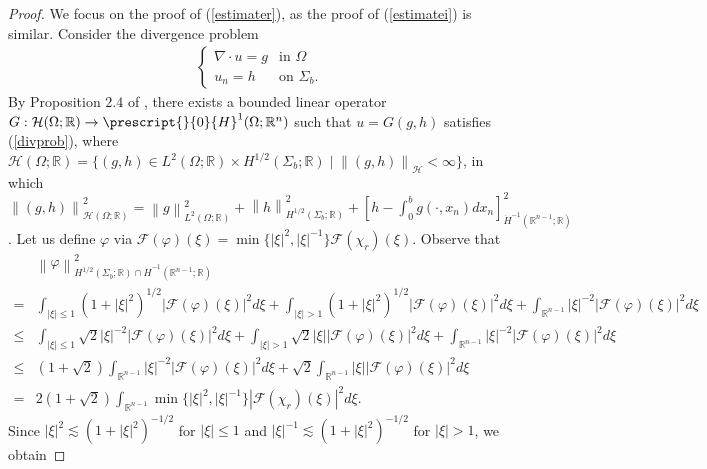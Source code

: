 \documentclass[11pt,letterpaper,reqno]{amsart}
\numberwithin{equation}{section}
\newcommand{\abs}[1]{\left\lvert#1\right\rvert}
\newcommand{\norm}[1]{\left\lVert#1\right\rVert}
\begin{document}
\begin{proof}
    We focus on the proof of (\ref{estimater}), as the proof of (\ref{estimatei}) is similar. Consider the divergence problem
    \begin{align} \label{divprob}
        \begin{cases}
            \nabla \cdot u = g &\mbox{in \(\Omega\)} \\
            u_{n}=h &\mbox{on \(\Sigma_{b}\)}.
        \end{cases}
    \end{align}
    By Proposition \(2.4\) of \cite{MR4337506}, there exists a bounded linear operator \(G:\mathcal{H}(\Omega;\mathbb{R}) \to \prescript{}{0}{H}^{1}(\Omega;\mathbb{R}^{n})\) such that \(u=G(g,h)\) satisfies (\ref{divprob}), where \(\mathcal{H}(\Omega;\mathbb{R})=\{(g,h)\in L^{2}(\Omega;\mathbb{R}) \times H^{1/2}(\Sigma_{b};\mathbb{R})\mid \norm{(g,h)}_{\mathcal{H}}<\infty\}\), in which \(\norm{(g,h)}_{\mathcal{H}(\Omega;\mathbb{R})}^{2}=\norm{g}_{L^{2}(\Omega;\mathbb{R})}^{2}+\norm{h}_{H^{1/2}(\Sigma_{b};\mathbb{R})}^{2}+[h-\int_{0}^{b}g(\cdot,x_{n})dx_{n}]_{\dot{H}^{-1}(\mathbb{R}^{n-1};\mathbb{R})}^{2}\). Let us define \(\varphi\) via \(\mathcal{F}(\varphi)(\xi)=\min\{\abs{\xi}^{2},\abs{\xi}^{-1}\}\mathcal{F}(\chi_{r})(\xi)\). Observe that
    \begin{align}
        &\norm{\varphi}_{H^{1/2}(\Sigma_{b};\mathbb{R})\cap \dot{H}^{-1}(\mathbb{R}^{n-1};\mathbb{R})}^{2} \nonumber \\
        =&\int_{\abs{\xi} \leq 1}(1+\abs{\xi}^{2})^{1/2}\abs{\mathcal{F}(\varphi)(\xi)}^{2}d\xi+\int_{\abs{\xi}>1}(1+\abs{\xi}^{2})^{1/2}\abs{\mathcal{F}(\varphi)(\xi)}^{2}d\xi+\int_{\mathbb{R}^{n-1}}\abs{\xi}^{-2}\abs{\mathcal{F}(\varphi)(\xi)}^{2}d\xi \nonumber\\
        \leq&\int_{\abs{\xi}\leq 1}\sqrt{2}\abs{\xi}^{-2}\abs{\mathcal{F}(\varphi)(\xi)}^{2}d\xi+\int_{\abs{\xi}>1}\sqrt{2}\abs{\xi}\abs{\mathcal{F}(\varphi)(\xi)}^{2}d\xi+\int_{\mathbb{R}^{n-1}}\abs{\xi}^{-2}\abs{\mathcal{F}(\varphi)(\xi)}^{2}d\xi \nonumber\\
        \leq&(1+\sqrt{2})\int_{\mathbb{R}^{n-1}}\abs{\xi}^{-2}\abs{\mathcal{F}(\varphi)(\xi)}^{2}d\xi+\sqrt{2}\int_{\mathbb{R}^{n-1}}\abs{\xi}\abs{\mathcal{F}(\varphi)(\xi)}^{2}d\xi \nonumber\\
        =&2(1+\sqrt{2})\int_{\mathbb{R}^{n-1}}\min\{\abs{\xi}^{2},\abs{\xi}^{-1}\}\abs{\mathcal{F}(\chi_{r})(\xi)}^{2}d\xi.
    \end{align}
    Since \(\abs{\xi}^{2} \lesssim (1+\abs{\xi}^{2})^{-1/2}\) for \(\abs{\xi} \leq 1\) and \(\abs{\xi}^{-1} \lesssim (1+\abs{\xi}^{2})^{-1/2}\) for \(\abs{\xi}>1\), we obtain

\end{proof}
\end{document}
